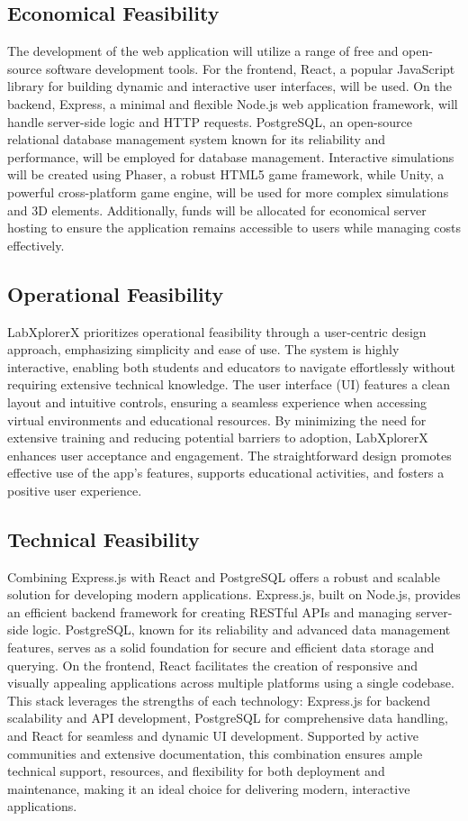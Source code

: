 \subsection{Economical Feasibility}
The development of the web application will utilize a range of free and open-source software development tools. For the frontend, React, a popular JavaScript library for building dynamic and interactive user interfaces, will be used. On the backend, Express, a minimal and flexible Node.js web application framework, will handle server-side logic and HTTP requests. PostgreSQL, an open-source relational database management system known for its reliability and performance, will be employed for database management. Interactive simulations will be created using Phaser, a robust HTML5 game framework, while Unity, a powerful cross-platform game engine, will be used for more complex simulations and 3D elements. Additionally, funds will be allocated for economical server hosting to ensure the application remains accessible to users while managing costs effectively.
\subsection{Operational Feasibility}
LabXplorerX prioritizes operational feasibility through a user-centric design approach, emphasizing simplicity and ease of use. The system is highly interactive, enabling both students and educators to navigate effortlessly without requiring extensive technical knowledge. The user interface (UI) features a clean layout and intuitive controls, ensuring a seamless experience when accessing virtual environments and educational resources. By minimizing the need for extensive training and reducing potential barriers to adoption, LabXplorerX enhances user acceptance and engagement. The straightforward design promotes effective use of the app's features, supports educational activities, and fosters a positive user experience.
\subsection{Technical Feasibility}
Combining Express.js with React and PostgreSQL offers a robust and scalable solution for developing modern applications. Express.js, built on Node.js, provides an efficient backend framework for creating RESTful APIs and managing server-side logic. PostgreSQL, known for its reliability and advanced data management features, serves as a solid foundation for secure and efficient data storage and querying. On the frontend, React facilitates the creation of responsive and visually appealing applications across multiple platforms using a single codebase. This stack leverages the strengths of each technology: Express.js for backend scalability and API development, PostgreSQL for comprehensive data handling, and React for seamless and dynamic UI development. Supported by active communities and extensive documentation, this combination ensures ample technical support, resources, and flexibility for both deployment and maintenance, making it an ideal choice for delivering modern, interactive applications.
